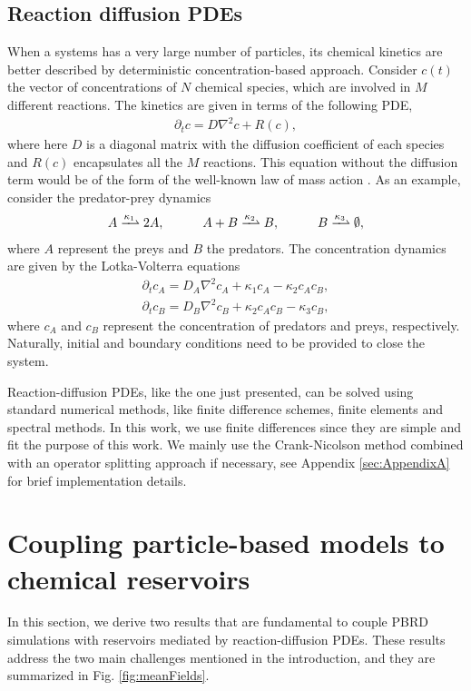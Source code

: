 \documentclass[10pt,twocolumn]{revtex4-1}
\begin{document}
	\subsection{Reaction diffusion PDEs}
	When a systems has a very large number of particles, its chemical kinetics are better described by deterministic concentration-based approach. Consider $c(t)$ the vector of concentrations of $N$ chemical species, which are involved in $M$ different reactions. The kinetics are given in terms of the following PDE,
	\begin{align*}
	\partial_{t} c= D\nabla^2 c + R(c),
	\end{align*}
	where here $D$ is a diagonal matrix with the diffusion coefficient of each species and $R(c)$ encapsulates all the $M$ reactions. This equation without the diffusion term would be of the form of the well-known law of mass action \cite{beard2008chemical}. As an example, consider the predator-prey dynamics
	\begin{align}
	A  \xrightharpoonup{\kappa_1} 2 A, \ \ \ \ \ \ \ \ \ 
	A + B  \xrightharpoonup{\kappa_2} B, \ \ \ \ \ \ \ \ \
	B  \xrightharpoonup{\kappa_3} \emptyset,
	\end{align}
	where $A$ represent the preys and $B$ the predators. The concentration dynamics are given by the Lotka-Volterra equations
	\begin{align*}
	\partial_t c_A = D_A\nabla^2 c_A + \kappa_1 c_A - \kappa_2 c_A c_B, \\
	\partial_t c_B = D_B\nabla^2 c_B + \kappa_2 c_A c_B - \kappa_3 c_B,
	\end{align*}
	where $c_A$ and $c_B$ represent the concentration of predators and preys, respectively. Naturally, initial and boundary conditions need to be provided to close the system.
	
	Reaction-diffusion PDEs, like the one just presented, can be solved using standard numerical methods, like finite difference schemes, finite elements and spectral methods. In this work, we use finite differences \cite{leveque2007finite, kostrethesis,salsa2013primeR} since they are simple and fit the purpose of this work. We mainly use the Crank-Nicolson method combined with an operator splitting approach if necessary, see Appendix \ref{sec:AppendixA} for brief implementation details.
	
	
	\section{Coupling particle-based models to chemical reservoirs}\label{sec:coupling}
	In this section, we derive two results that are fundamental to couple PBRD simulations with reservoirs mediated by reaction-diffusion PDEs. These results address the two main challenges mentioned in the introduction, and they are summarized in Fig. \ref{fig:meanFields}. 
	
\end{document}
